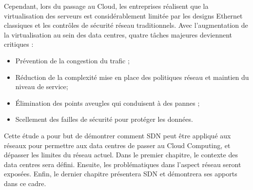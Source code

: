 \par
Cependant, lors du passage au Cloud, les entreprises réalisent que la virtualisation des serveurs est considérablement limitée par les designs Ethernet classiques et les contrôles de sécurité réseau traditionnels. Avec l'augmentation de la virtualisation au sein des data centres, quatre tâches majeures deviennent critiques :
\begin{itemize}
\item Prévention de la congestion du trafic ;
\item Réduction de la complexité mise en place des politiques réseau et maintien du niveau de service;
\item Élimination des points aveugles qui conduisent à des pannes ;
\item  Scellement des failles de sécurité pour protéger les données. \cite{virtualizedCCCC}\\
\end{itemize}

\par
Cette étude a pour but de démontrer comment SDN peut être appliqué aux réseaux pour permettre aux data centres de passer au Cloud Computing, et dépasser les limites du réseau actuel. Dans le premier chapitre, le contexte des data centres sera défini. Ensuite, les problématiques dans l'aspect réseau seront exposées. Enfin, le dernier chapitre présentera SDN et démontrera ses apports dans ce cadre.

